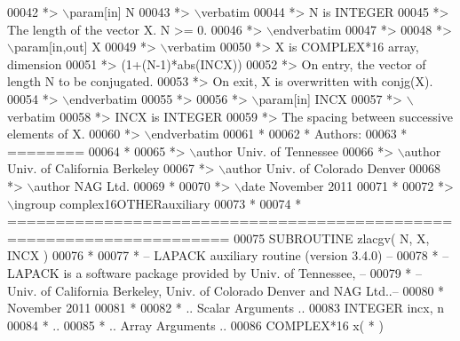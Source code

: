 \begin{DoxyCode}
00042 \textcolor{comment}{*> \(\backslash\)param[in] N}
00043 \textcolor{comment}{*> \(\backslash\)verbatim}
00044 \textcolor{comment}{*>          N is INTEGER}
00045 \textcolor{comment}{*>          The length of the vector X.  N >= 0.}
00046 \textcolor{comment}{*> \(\backslash\)endverbatim}
00047 \textcolor{comment}{*>}
00048 \textcolor{comment}{*> \(\backslash\)param[in,out] X}
00049 \textcolor{comment}{*> \(\backslash\)verbatim}
00050 \textcolor{comment}{*>          X is COMPLEX*16 array, dimension}
00051 \textcolor{comment}{*>                         (1+(N-1)*abs(INCX))}
00052 \textcolor{comment}{*>          On entry, the vector of length N to be conjugated.}
00053 \textcolor{comment}{*>          On exit, X is overwritten with conjg(X).}
00054 \textcolor{comment}{*> \(\backslash\)endverbatim}
00055 \textcolor{comment}{*>}
00056 \textcolor{comment}{*> \(\backslash\)param[in] INCX}
00057 \textcolor{comment}{*> \(\backslash\)verbatim}
00058 \textcolor{comment}{*>          INCX is INTEGER}
00059 \textcolor{comment}{*>          The spacing between successive elements of X.}
00060 \textcolor{comment}{*> \(\backslash\)endverbatim}
00061 \textcolor{comment}{*}
00062 \textcolor{comment}{*  Authors:}
00063 \textcolor{comment}{*  ========}
00064 \textcolor{comment}{*}
00065 \textcolor{comment}{*> \(\backslash\)author Univ. of Tennessee }
00066 \textcolor{comment}{*> \(\backslash\)author Univ. of California Berkeley }
00067 \textcolor{comment}{*> \(\backslash\)author Univ. of Colorado Denver }
00068 \textcolor{comment}{*> \(\backslash\)author NAG Ltd. }
00069 \textcolor{comment}{*}
00070 \textcolor{comment}{*> \(\backslash\)date November 2011}
00071 \textcolor{comment}{*}
00072 \textcolor{comment}{*> \(\backslash\)ingroup complex16OTHERauxiliary}
00073 \textcolor{comment}{*}
00074 \textcolor{comment}{*  =====================================================================}
00075 \textcolor{keyword}{      SUBROUTINE }zlacgv( N, X, INCX )
00076 \textcolor{comment}{*}
00077 \textcolor{comment}{*  -- LAPACK auxiliary routine (version 3.4.0) --}
00078 \textcolor{comment}{*  -- LAPACK is a software package provided by Univ. of Tennessee,    --}
00079 \textcolor{comment}{*  -- Univ. of California Berkeley, Univ. of Colorado Denver and NAG Ltd..--}
00080 \textcolor{comment}{*     November 2011}
00081 \textcolor{comment}{*}
00082 \textcolor{comment}{*     .. Scalar Arguments ..}
00083       \textcolor{keywordtype}{INTEGER}            incx, n
00084 \textcolor{comment}{*     ..}
00085 \textcolor{comment}{*     .. Array Arguments ..}
00086       \textcolor{keywordtype}{COMPLEX*16}         x( * )

\end{DoxyCode}
